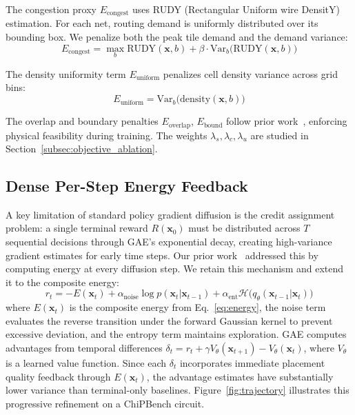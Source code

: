 \documentclass[sigconf,anonymous,review,9pt]{acmart}
\begin{document}
The congestion proxy $E_{\text{congest}}$ uses RUDY (Rectangular Uniform
wire DensitY) estimation. For each net, routing demand is uniformly
distributed over its bounding box. We penalize both the peak tile demand
and the demand variance:
\begin{equation}
\label{eq:congest}
E_{\text{congest}} = \max_b \text{RUDY}(\mathbf{x}, b)
+ \beta \cdot \text{Var}_b\!\big(\text{RUDY}(\mathbf{x}, b)\big)
\end{equation}

The density uniformity term $E_{\text{uniform}}$ penalizes cell density
variance across grid bins:
\begin{equation}
\label{eq:uniform}
E_{\text{uniform}} = \text{Var}_b\!\big(
\text{density}(\mathbf{x}, b)\big)
\end{equation}

The overlap and boundary penalties $E_{\text{overlap}}$,
$E_{\text{bound}}$ follow prior work~\cite{chen2026dac, lee2024chip},
enforcing physical feasibility during training. The weights
$\lambda_s, \lambda_c, \lambda_u$ are studied in
Section~\ref{subsec:objective_ablation}.


\subsection{Dense Per-Step Energy Feedback}

A key limitation of standard policy gradient diffusion is the credit
assignment problem: a single terminal reward $R(\mathbf{x}_0)$ must be
distributed across $T$ sequential decisions through GAE's exponential
decay, creating high-variance gradient estimates for early time steps.
Our prior work~\cite{chen2026dac} addressed this by computing energy at
every diffusion step. We retain this mechanism and extend it to the
composite energy:
\begin{equation}
\label{eq:reward}
r_t = -E(\mathbf{x}_t)
+ \alpha_{\text{noise}} \log p(\mathbf{x}_t | \mathbf{x}_{t-1})
+ \alpha_{\text{ent}} \mathcal{H}\!\big(q_\theta(\mathbf{x}_{t-1} |
\mathbf{x}_t)\big)
\end{equation}
where $E(\mathbf{x}_t)$ is the composite energy from
Eq.~\eqref{eq:energy}, the noise term evaluates the reverse transition
under the forward Gaussian kernel to prevent excessive deviation, and
the entropy term maintains exploration. GAE computes advantages from
temporal differences $\delta_t = r_t + \gamma V_\theta(\mathbf{x}_{t+1})
- V_\theta(\mathbf{x}_t)$, where $V_\theta$ is a learned value
function. Since each $\delta_t$ incorporates immediate placement quality
feedback through $E(\mathbf{x}_t)$, the advantage estimates have
substantially lower variance than terminal-only baselines.
Figure~\ref{fig:trajectory} illustrates this progressive refinement on a
ChiPBench circuit.
\end{document}
